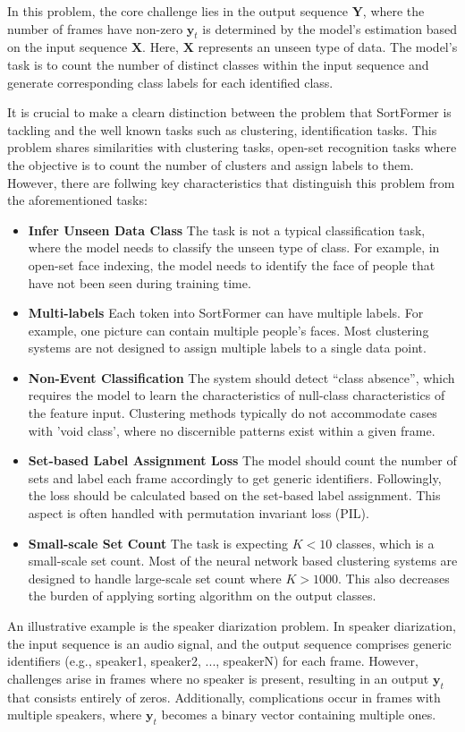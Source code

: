 \documentclass{article}
\begin{document}
In this problem, the core challenge lies in the output sequence $\mathbf{Y}$, where the number of frames have non-zero $\mathbf{y}_{t}$ is determined by the model's estimation
based on the input sequence $\mathbf{X}$. Here, $\mathbf{X}$ represents an unseen type of data. The model's task is to count the number of distinct classes
within the input sequence and generate corresponding class labels for each identified class.

It is crucial to make a clearn distinction between the problem that SortFormer is tackling and the well known tasks such as clustering, identification tasks. 
This problem shares similarities with clustering tasks, open-set recognition tasks where the objective is to count the number of clusters and assign labels to them. However,
there are follwing key characteristics that distinguish this problem from the aforementioned tasks:

\begin{itemize}[leftmargin=*]
  \item \textbf{Infer Unseen Data Class} The task is not a typical classification task, where the model needs to classify the unseen type of class. For example, 
  in open-set face indexing, the model needs to identify the face of people that have not been seen during training time. 
  \item \textbf{Multi-labels} Each token into SortFormer can have multiple labels. For example, one picture can contain multiple people's faces. Most clustering systems are not designed to assign multiple labels to a single data point.
  \item \textbf{Non-Event Classification} The system should detect ``class absence'', which requires the model to learn the characteristics of null-class characteristics of the feature input. 
  Clustering methods typically do not accommodate cases with 'void class', where no discernible patterns exist within a given frame.
  \item \textbf{Set-based Label Assignment Loss} The model should count the number of sets and label each frame accordingly to get generic identifiers. Followingly, the loss should be calculated based on the set-based label assignment. 
  This aspect is often handled with permutation invariant loss (PIL).
  \item \textbf{Small-scale Set Count} The task is expecting $K<10$ classes, which is a small-scale set count. Most of the neural network based clustering systems are designed to handle large-scale set count where $K > 1000$. This also
  decreases the burden of applying sorting algorithm on the output classes.
\end{itemize}
An illustrative example is the speaker diarization problem. In speaker diarization, the input sequence is an audio signal, and the output sequence comprises
generic identifiers (e.g., speaker1, speaker2, ..., speakerN) for each frame. However, challenges arise in frames where no speaker is present, resulting in
an output $\mathbf{y}_t$ that consists entirely of zeros. Additionally, complications occur in frames with multiple speakers, where $\mathbf{y}_t$ becomes
a binary vector containing multiple ones.
\end{document}
